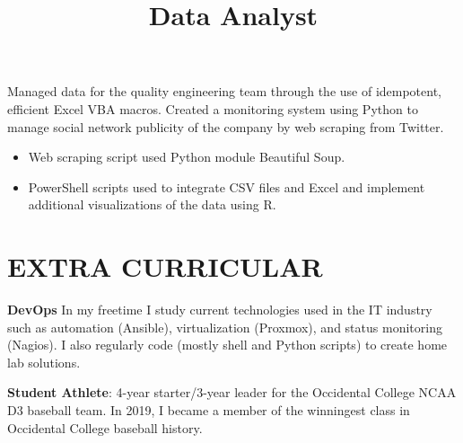 \documentclass[margin]{res}
\begin{document}
\begin{resume}
\title{\textbf{Data Analyst}}
\begin{position}
	Managed data for the quality engineering team through the use of idempotent, efficient Excel VBA macros. Created a monitoring system using Python to manage social network publicity of the company by web scraping from Twitter.
	\begin{itemize}
		\item Web scraping script used Python module Beautiful Soup.
		\item PowerShell scripts used to integrate CSV files and Excel and implement additional visualizations of the data using R.
	\end{itemize}
\end{position}




\section{EXTRA CURRICULAR}
\par
\textbf{DevOps}
In my freetime I study current technologies used in the IT industry such as automation (Ansible), virtualization (Proxmox), and status monitoring (Nagios). I also regularly code (mostly shell and Python scripts) to create home lab solutions.
\par
\textbf{Student Athlete}: 4-year starter/3-year leader for the Occidental College NCAA D3 baseball team. In 2019, I became a member of the winningest class in Occidental College baseball history.
\par


\end{resume}
\end{document}
